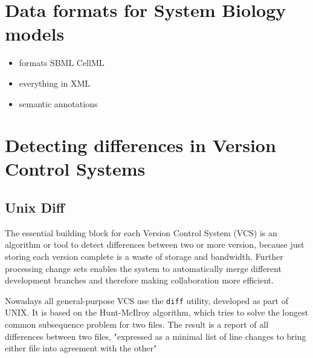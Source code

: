 \section{Data formats for System Biology models}
	\begin{itemize}
		\item formats
		\subitem SBML
		\subitem CellML
		\subitem \sedml
		\item everything in XML
		\item semantic annotations
	\end{itemize}

\section{Detecting differences in Version Control Systems}
	\subsection{Unix Diff}
	\label{sec:background:diff:unix-diff}
	The essential building block for each Version Control System (VCS) is an algorithm or tool to detect differences between two or more version, because just storing each version complete is a waste of storage and bandwidth. Further processing change sets enables the system to automatically merge different development branches and therefore making collaboration more efficient.
	
	Nowadays all general-purpose VCS use the \texttt{diff} utility, developed as part of UNIX. It is based on the Hunt-McIlroy algorithm, which tries to solve the longest common subsequence problem for two files. \cite{Hunt1976}
	The result is a report of all differences between two files, "expressed as a minimal list of line changes to bring either file into agreement with the other" \cite{Hunt1976}
	
	\begin{comment}
	\begin{itemize}
		\item Based on solving the longest common subsequence problem
		\item "The program diff reports differences between two files, expressed as a minimal list of line changes to bring either file into agreement with the other" \cite{Hunt1976}
		\item "The central algorithm of diff solves the ‘longest common subsequence problem’ to find the lines that do not change between files" \cite{Hunt1976}
	\end{itemize}
	\end{comment}
	
